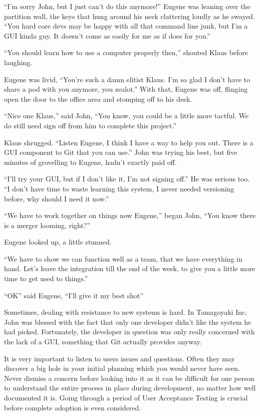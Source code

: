 \begin{trenches}
``I'm sorry John, but I just can't do this anymore!''
Eugene was leaning over the partition wall, the keys that hung around his neck clattering loudly as he swayed.
``You hard core devs may be happy with all that command line junk, but I'm a GUI kinda guy. It doesn't come as easily for me as if does for you.''

``You should learn how to use a computer properly then,'' shouted Klaus before laughing.

Eugene was livid, ``You're such a damn elitist Klaus. I'm so glad I don't have to share a pod with you anymore, you zealot.''
With that, Eugene was off, flinging open the door to the office area and stomping off to his desk.

``Nice one Klaus,'' said John,
``You know, you could be a little more tactful. We do still need sign off from him to complete this project.''

Klaus shrugged.
\thoughtbreak
``Listen Eugene, I think I have a way to help you out. There is a GUI component to Git that you can use.''
John was trying his best, but five minutes of grovelling to Eugene, hadn't exactly paid off.

``I'll try your GUI, but if I don't like it, I'm not signing off.''
He was serious too.
``I don't have time to waste learning this system, I never needed versioning before, why should I need it now.''

``We have to work together on things now Eugene,'' began John,
``You know there is a merger looming, right?''

Eugene looked up, a little stunned.

``We have to show we can function well as a team, that we have everything in hand. Let's leave the integration till the end of the week, to give you a little more time to get used to things.''

``OK'' said Eugene,
``I'll give it my best shot''
\end{trenches}

Sometimes, dealing with resistance to new systems is hard.
In Tamagoyaki Inc, John was blessed with the fact that only one developer didn't like the system he had picked.
Fortunately, the developer in question was only really concerned with the lack of a GUI, something that Git actually provides anyway.

It is very important to listen to users issues and questions.
Often they may discover a big hole in your initial planning which you would never have seen.
Never dismiss a concern before looking into it as it can be difficult for one person to understand the entire process in place during development, no matter how well documented it is.
Going through a period of User Acceptance Testing is crucial before complete adoption is even considered.

